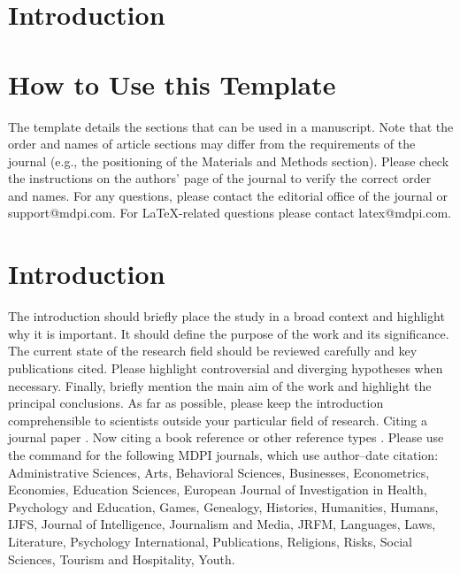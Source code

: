 \documentclass[preprints,article,submit,pdftex,oneauthor]{Definitions/mdpi}
\begin{document}
\iffalse
\section{Introduction}
\setcounter{section}{-1} %
\section{How to Use this Template}

The template details the sections that can be used in a manuscript. Note that the order and names of article sections may differ from the requirements of the journal (e.g., the positioning of the Materials and Methods section). Please check the instructions on the authors' page of the journal to verify the correct order and names. For any questions, please contact the editorial office of the journal or support@mdpi.com. For LaTeX-related questions please contact latex@mdpi.com.%


\section{Introduction}

The introduction should briefly place the study in a broad context and highlight why it is important. It should define the purpose of the work and its significance. The current state of the research field should be reviewed carefully and key publications cited. Please highlight controversial and diverging hypotheses when necessary. Finally, briefly mention the main aim of the work and highlight the principal conclusions. As far as possible, please keep the introduction comprehensible to scientists outside your particular field of research. Citing a journal paper \citep{ref-journal}.  Now citing a book reference \citep{ref-book1,ref-book2} or other reference types \citep{ref-unpublish,ref-url}. Please use the command \citep{ref-proceeding,ref-thesis} for the following MDPI journals, which use author--date citation: Administrative Sciences, Arts, Behavioral Sciences, Businesses, Econometrics, Economies, Education Sciences, European Journal of Investigation in Health, Psychology and Education, Games, Genealogy, Histories, Humanities, Humans, IJFS, Journal of Intelligence, Journalism and Media, JRFM, Languages, Laws, Literature, Psychology International, Publications, Religions, Risks, Social Sciences, Tourism and Hospitality, Youth. 
\end{document}
